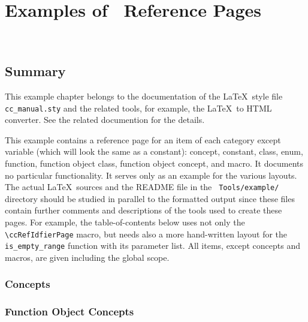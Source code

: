 
\chapter{Examples of \CC\ Reference Pages}
\\

\section*{Summary}

This example chapter belongs to the documentation of the \LaTeX\ style
file {\tt cc\_manual.sty} and the related tools, for example, the
\LaTeX\ to HTML converter. See the related documention for the details.

This example contains a reference page for an item of each category except
variable (which will look the same as a constant):
concept, constant, class, enum, function, function object class, function
object concept, and macro. It documents no
particular functionality. It serves only as an example for the various
layouts. The actual \LaTeX\ sources and the README file in the {\tt
  Tools/example/} directory should be studied in parallel to the
formatted output since these files contain further comments and 
descriptions of the tools used to create these pages. 
For example, the
table-of-contents below uses not only the \verb+\ccRefIdfierPage+
macro, but needs also a more hand-written layout for the
\verb+is_empty_range+ function with its parameter list.  All items,
except concepts and macros, are given including the global scope.


\subsection*{Concepts}


\subsection*{Function Object Concepts}

